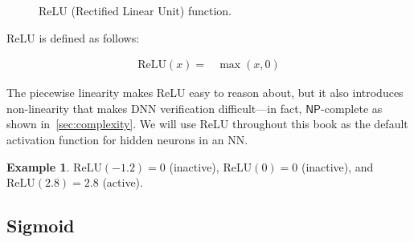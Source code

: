 \documentclass[oneside,11pt,dvipsnames]{book}
\numberwithin{equation}{section}
\theoremstyle{definition}
\newtheorem{example}{Example}[section]
\theoremstyle{remark}
\newcommand{\relu}[1]{\mathrm{ReLU}\left(#1\right)}
\begin{document}
\begin{figure}[h]
    \centering
    \caption{ReLU (Rectified Linear Unit) function.}\label{fig:relu}
\end{figure}


ReLU is defined as follows:

\begin{align}
\relu{x} = &\max(x,0)
\end{align}


The piecewise linearity makes ReLU easy to reason about, but it also introduces non-linearity that makes DNN verification difficult---in fact, $\mathsf{NP}$-complete as shown in~\autoref{sec:complexity}. We will use ReLU throughout this book as the default activation function for hidden neurons in an NN. 
    
\begin{example}
$\relu{-1.2} = 0$ (inactive), $\relu{0} = 0$ (inactive), and $\relu{2.8} = 2.8$ (active).
\end{example}


\subsection{Sigmoid}\label{sec:sigmoid}
\end{document}
